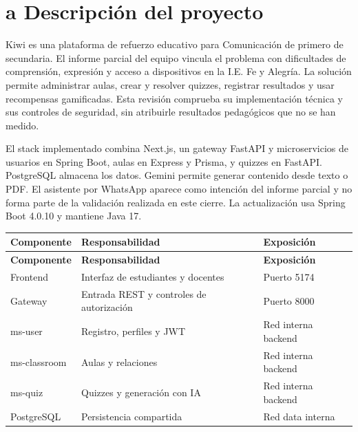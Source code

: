 \documentclass[12pt,a4paper]{article}
\begin{document}
\section*{a Descripción del proyecto}
Kiwi es una plataforma de refuerzo educativo para Comunicación de primero de secundaria. El informe parcial del equipo vincula el problema con dificultades de comprensión, expresión y acceso a dispositivos en la I.E. Fe y Alegría. La solución permite administrar aulas, crear y resolver quizzes, registrar resultados y usar recompensas gamificadas. Esta revisión comprueba su implementación técnica y sus controles de seguridad, sin atribuirle resultados pedagógicos que no se han medido.\par
El stack implementado combina Next.js, un gateway FastAPI y microservicios de usuarios en Spring Boot, aulas en Express y Prisma, y quizzes en FastAPI. PostgreSQL almacena los datos. Gemini permite generar contenido desde texto o PDF. El asistente por WhatsApp aparece como intención del informe parcial y no forma parte de la validación realizada en este cierre. La actualización usa Spring Boot 4.0.10 y mantiene Java 17.\par
{\small\setlength{\tabcolsep}{4pt}\renewcommand{\arraystretch}{1.18}
\begin{longtable}{>{\RaggedRight\arraybackslash}p{}>{\RaggedRight\arraybackslash}p{}>{\RaggedRight\arraybackslash}p{}}
\toprule
\textbf{Componente} & \textbf{Responsabilidad} & \textbf{Exposición} \\
\midrule\endfirsthead
\toprule
\textbf{Componente} & \textbf{Responsabilidad} & \textbf{Exposición} \\
\midrule\endhead
\bottomrule\endfoot
Frontend & Interfaz de estudiantes y docentes & Puerto 5174 \\[3pt]
Gateway & Entrada REST y controles de autorización & Puerto 8000 \\[3pt]
ms-user & Registro, perfiles y JWT & Red interna backend \\[3pt]
ms-classroom & Aulas y relaciones & Red interna backend \\[3pt]
ms-quiz & Quizzes y generación con IA & Red interna backend \\[3pt]
PostgreSQL & Persistencia compartida & Red data interna \\[3pt]
\end{longtable}}
\end{document}
